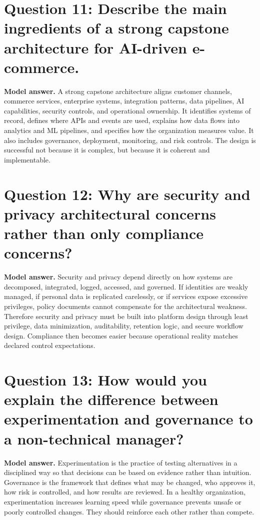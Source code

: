 \section*{Question 11: Describe the main ingredients of a strong capstone architecture for AI-driven e-commerce.}
\textbf{Model answer.}
A strong capstone architecture aligns customer channels, commerce services, enterprise systems, integration patterns, data pipelines, AI capabilities, security controls, and operational ownership.
It identifies systems of record, defines where APIs and events are used, explains how data flows into analytics and ML pipelines, and specifies how the organization measures value.
It also includes governance, deployment, monitoring, and risk controls.
The design is successful not because it is complex, but because it is coherent and implementable.

\section*{Question 12: Why are security and privacy architectural concerns rather than only compliance concerns?}
\textbf{Model answer.}
Security and privacy depend directly on how systems are decomposed, integrated, logged, accessed, and governed.
If identities are weakly managed, if personal data is replicated carelessly, or if services expose excessive privileges, policy documents cannot compensate for the architectural weakness.
Therefore security and privacy must be built into platform design through least privilege, data minimization, auditability, retention logic, and secure workflow design.
Compliance then becomes easier because operational reality matches declared control expectations.

\section*{Question 13: How would you explain the difference between experimentation and governance to a non-technical manager?}
\textbf{Model answer.}
Experimentation is the practice of testing alternatives in a disciplined way so that decisions can be based on evidence rather than intuition.
Governance is the framework that defines what may be changed, who approves it, how risk is controlled, and how results are reviewed.
In a healthy organization, experimentation increases learning speed while governance prevents unsafe or poorly controlled changes.
They should reinforce each other rather than compete.

